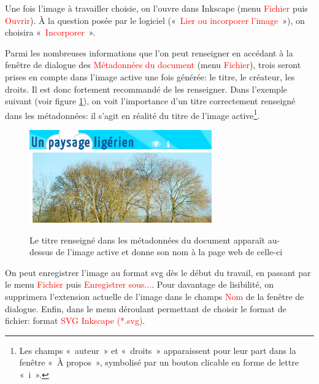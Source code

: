 \documentclass[a4paper,12pt]{report}
\newcommand{\chemin}[1]{\textcolor{red}{#1}}
\begin{document}
Une fois l'image à travailler choisie, on l'ouvre dans Inkscape (menu \chemin{Fichier} puis \chemin{Ouvrir}).
À la question posée par le logiciel («~\chemin{Lier ou incorporer l'image}~»), on choisira «~\chemin{Incorporer}~».

Parmi les nombreuses informations que l'on peut renseigner en accédant à la fenêtre de dialogue des 
\chemin{Métadonnées du document} (menu \chemin{Fichier}), trois seront prises en compte dans l'image active
une fois générée: le titre, le créateur, les droits.
Il est donc fortement recommandé de les renseigner.
Dans l'exemple suivant (voir figure \ref{titre_ia}), on voit l'importance d'un titre correctement
renseigné dans les métadonnées: il s'agit en réalité du titre de l'image active\footnote{Les champs 
«~auteur~» et «~droits~» apparaissent pour leur part dans la fenêtre «~À propos~», symbolisé par 
un bouton clicable en forme de lettre «~i~».}.

\begin{figure}[htp]
 \centering
 \caption{Le titre renseigné dans les métadonnées du document apparaît au-dessus de l'image active 
 et donne son nom à la page web de celle-ci}
 \includegraphics[width=0.7\textwidth]{images/titre_ia}
 \label{titre_ia}
\end{figure}

On peut enregistrer l'image au format svg dès le début du travail, en
passant par le menu \chemin{Fichier} puis \chemin{Enregistrer sous...}.
Pour davantage de lisibilité, on supprimera l'extension actuelle de l'image dans le champs \chemin{Nom} 
 de la fenêtre de dialogue. Enfin, dans le menu déroulant permettant de choisir le format de 
 fichier: format \chemin{SVG Inkscape (*.svg)}.
\end{document}
